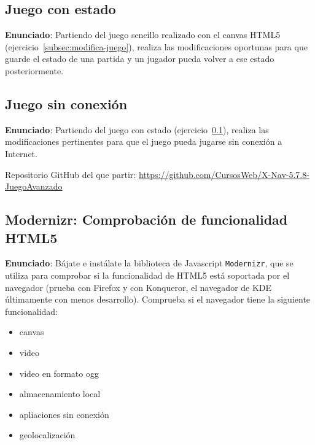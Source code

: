 \subsection{Juego con estado}
\label{subsec:juego-con-estado}

\textbf{Enunciado}: Partiendo del juego sencillo realizado con el canvas HTML5 (ejercicio~\ref{subsec:modifica-juego}), realiza las modificaciones oportunas para que guarde el estado de una partida y un jugador pueda volver a ese estado posteriormente.

\subsection{Juego sin conexión}
\label{subsec:juego-sin-conexion}

\textbf{Enunciado}: Partiendo del juego con estado (ejercicio~\ref{subsec:juego-con-estado}), realiza las modificaciones pertinentes para que el juego pueda jugarse sin conexión a Internet.

Repositorio GitHub del que partir: \url{https://github.com/CursosWeb/X-Nav-5.7.8-JuegoAvanzado}

\subsection{Modernizr: Comprobación de funcionalidad HTML5}
\label{subsec:modernizr}

\textbf{Enunciado}: Bájate e instálate la biblioteca de Javascript \texttt{Modernizr}, que se utiliza para comprobar si la funcionalidad de HTML5 está soportada por el navegador (prueba con Firefox y con Konqueror, el navegador de KDE últimamente con menos desarrollo). Comprueba si el navegador tiene la siguiente funcionalidad:

\begin{itemize}
  \item canvas
  \item video
  \item video en formato ogg
  \item almacenamiento local
  \item apliaciones sin conexión
  \item geolocalización
\end{itemize}  


